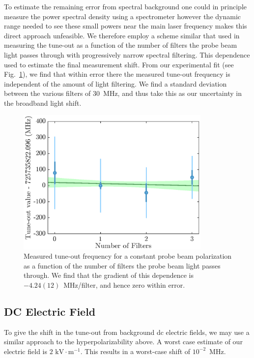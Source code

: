 \documentclass[%
 amsmath,amssymb,
aps,
]{revtex4-2}
\begin{document}
To estimate the remaining error from spectral background one could in principle measure the power spectral density using a spectrometer however the dynamic range needed to see these small powers near the main laser frequency makes this direct approach unfeasible. We therefore employ a scheme similar that used in \cite{PhysRevA.92.052501} measuring the tune-out as a function of the number of filters the probe beam light passes through with progressively narrow spectral filtering. This dependence used to estimate  the final measurement shift. From our experimental fit (see Fig.~\ref{fig:broadband light dependence}), we find that within error there the measured tune-out frequency is independent of the amount of light filtering. We find a standard deviation between the various filters of \(30\)~MHz, and thus take this as our uncertainty in the broadband light shift.
 
\begin{figure}[t]
    \centering
    \includegraphics[width=0.85\textwidth]{figs/soms/filt_dep}
    \caption{Measured tune-out frequency for a constant probe beam polarization as a function of the number of filters the probe beam light passes through. We find that the gradient of this dependence is \(-4.24(12)\)~MHz/filter, and hence zero within error.
    }
    \label{fig:broadband light dependence}
\end{figure}

\subsection{DC Electric Field}
To give the shift in the tune-out from background dc electric fields, we may use a similar approach to the hyperpolarizability above. A worst case estimate of our electric field is $2 \, \,\text{kV}\cdot\text{m}^{-1}$. This results in a worst-case shift of \(10^{-2}\)~MHz.
\end{document}
